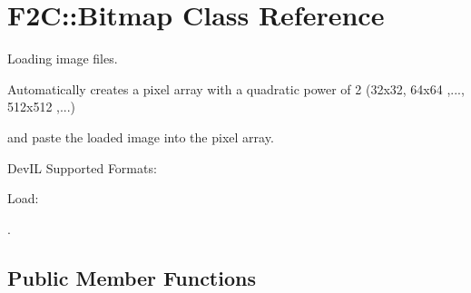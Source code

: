 \hypertarget{class_f2_c_1_1_bitmap}{
\section{F2C::Bitmap Class Reference}
\label{class_f2_c_1_1_bitmap}
}


Loading image files. \par
 Automatically creates a pixel array with a quadratic power of 2 (32x32, 64x64 ,..., 512x512 ,...) \par
 and paste the loaded image into the pixel array. \par
 DevIL Supported Formats: \par
 Load: \par
.  
\subsection*{Public Member Functions}
